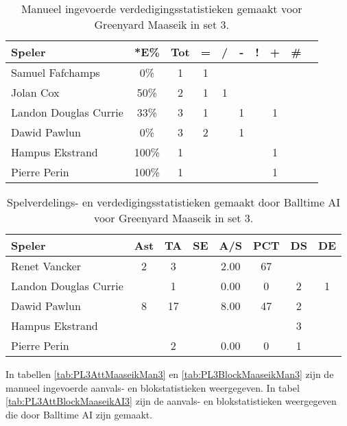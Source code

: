 \begin{table}[ht!]
    \centering
    \scriptsize
    \begin{tabular}{|l|c|c|c|c|c|c|c|c|c|} \hline
        \textbf{Speler} & *E\% & Tot & = & / & - & ! & + & \#\\ \hline
        Samuel Fafchamps & 0\% & 1 & 1 &  &  &  &  &  \\ 
        Jolan Cox & 50\% & 2 & 1 & 1 &  &  &  & \\
        Landon Douglas Currie & 33\% & 3 & 1 &  & 1 &  & 1 &  \\
        Dawid Pawlun & 0\% & 3 & 2 &  & 1 &  &  &  \\ 
        Hampus Ekstrand & 100\% & 1 &  &  &  &  & 1 &\\ 
        Pierre Perin & 100\% & 1 &  &  &  &  & 1 & \\ \hline
    \end{tabular}
    \caption[Manueel ingevoerde verdedigingsstatistieken gemaakt voor Greenyard Maaseik in set 3]{\label{tab:PL3DigMaaseikMan3}Manueel ingevoerde verdedigingsstatistieken gemaakt voor Greenyard Maaseik in set 3.}
\end{table}

\begin{table}[ht!]
  \centering
  \scriptsize
    \begin{tabular}{|l|c|c|c|c|c|c|c|} \hline
    \textbf{Speler} & Ast & TA & SE & A/S & PCT & DS & DE \\ \hline
    Renet Vancker & 2 & 3 &  & 2.00 & 67 &   &   \\
    Landon Douglas Currie &  & 1 &  & 0.00 & 0 & 2 & 1 \\
    Dawid Pawlun & 8 & 17 & & 8.00 & 47 & 2 &  \\
    Hampus Ekstrand &  &  &  &  &  & 3 &  \\
    Pierre Perin &  & 2 &  & 0.00 & 0 & 1 &  \\ \hline
  \end{tabular}
  \caption[Spelverdelings- en verdedigingsstatistieken gemaakt door Balltime AI voor Greenyard Maaseik in set 3]{\label{tab:PL3SetDigMaaseikAI3}Spelverdelings- en verdedigingsstatistieken gemaakt door Balltime AI voor Greenyard Maaseik in set 3.}
\end{table}

In tabellen \ref{tab:PL3AttMaaseikMan3} en \ref{tab:PL3BlockMaaseikMan3} zijn de manueel ingevoerde aanvals- en blokstatistieken weergegeven. In tabel \ref{tab:PL3AttBlockMaaseikAI3} zijn de aanvals- en blokstatistieken weergegeven die door Balltime AI zijn gemaakt. 

